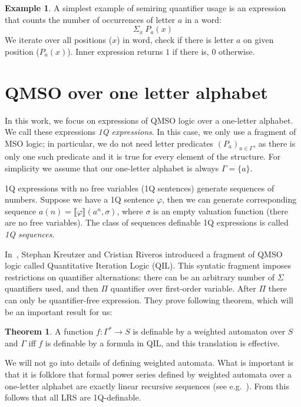 \documentclass[en]{pracamgr}
\theoremstyle{definition}
\newtheorem{theorem}{Theorem}[section]
\newtheorem{example}{Example}[section]
\begin{document}
\begin{example}
    A simplest example of semiring quantifier usage is an expression that counts the number of occurrences of letter $a$ in a word:
    $$\Sigma_x \ P_a(x)$$
    We iterate over all positions ($x$) in word, check if there is letter $a$ on given position ($P_a(x)$). Inner expression returns $1$ if there is, $0$ otherwise. 
\end{example}

\section{QMSO over one letter alphabet}

In this work, we focus on expressions of QMSO logic over a one-letter alphabet. We call these expressions \emph{1Q expressions}. In this case, we only use a fragment of MSO logic; in particular, we do not need letter predicates $(P_a)_{a \in \Gamma}$, as there is only one such predicate and it is true for every element of the structure. For simplicity we assume that our one-letter alphabet is always $\Gamma = \{a\}$.

1Q expressions with no free variables (1Q sentences) generate sequences of numbers. Suppose we have a 1Q sentence $\varphi$, then we can generate corresponding sequence $a(n) = \llbracket \varphi \rrbracket (a^n, \sigma)$, where $\sigma$ is an empty valuation function (there are no free variables). The class of sequences definable 1Q expressions is called \emph{1Q sequences}.

In~\cite[Section IV]{KreutzerR13}, Stephan Kreutzer and Cristian Riveros introduced a fragment of QMSO logic called Quantitative Iteration Logic (QIL). This syntatic fragment imposes restrictions on quantifier alternations: there can be an arbitrary number of $\Sigma$ quantifiers used, and then $\Pi$ quantifier over first-order variable. After $\Pi$ there can only be quantifier-free expression. They prove following theorem, which will be an important result for us:

\begin{theorem}
\label{QILWL}
    A function $f: \Gamma^* \rightarrow S$ is definable by a weighted automaton over $S$ and $\Gamma$ iff $f$ is definable by a formula in QIL, and this translation is effective.
\end{theorem}

We will not go into details of defining weighted automata. What is important is that it is folklore that formal power series defined by weighted automata over a one-letter alphabet are exactly linear recursive sequences (see e.g.~\cite{BarloyFLM22}). From this follows that all LRS are 1Q-definable.
\end{document}
